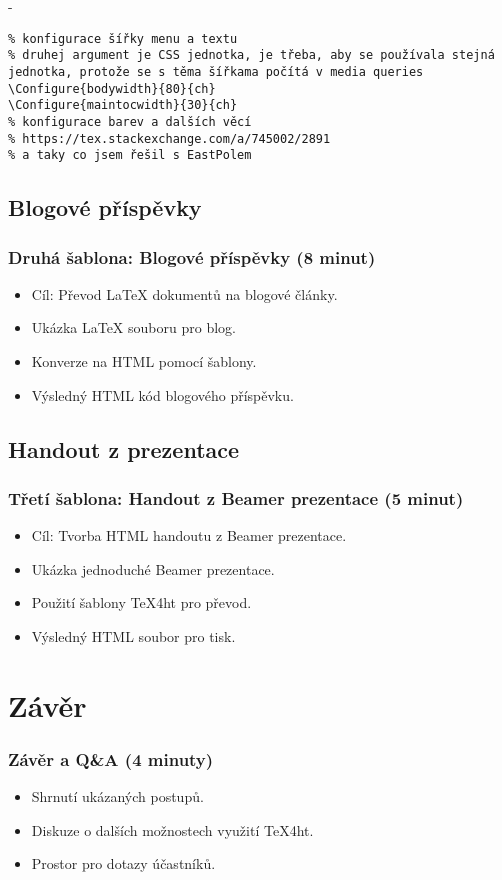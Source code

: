 \documentclass{beamer}
\begin{document}
- 

\begin{verbatim}
% konfigurace šířky menu a textu
% druhej argument je CSS jednotka, je třeba, aby se používala stejná jednotka, protože se s těma šířkama počítá v media queries
\Configure{bodywidth}{80}{ch}
\Configure{maintocwidth}{30}{ch}
% konfigurace barev a dalších věcí
% https://tex.stackexchange.com/a/745002/2891
% a taky co jsem řešil s EastPolem
\end{verbatim}


\subsection{Blogové příspěvky}
\begin{frame}
\frametitle{Druhá šablona: Blogové příspěvky (8 minut)}
\begin{itemize}
    \item Cíl: Převod LaTeX dokumentů na blogové články.
    \item Ukázka LaTeX souboru pro blog.
    \item Konverze na HTML pomocí šablony.
    \item Výsledný HTML kód blogového příspěvku.
\end{itemize}
\end{frame}

\subsection{Handout z prezentace}
\begin{frame}
\frametitle{Třetí šablona: Handout z Beamer prezentace (5 minut)}
\begin{itemize}
    \item Cíl: Tvorba HTML handoutu z Beamer prezentace.
    \item Ukázka jednoduché Beamer prezentace.
    \item Použití šablony TeX4ht pro převod.
    \item Výsledný HTML soubor pro tisk.
\end{itemize}
\end{frame}

\section{Závěr}

\begin{frame}
\frametitle{Závěr a Q\&A (4 minuty)}
\begin{itemize}
    \item Shrnutí ukázaných postupů.
    \item Diskuze o dalších možnostech využití TeX4ht.
    \item Prostor pro dotazy účastníků.
\end{itemize}
\end{frame}
\end{document}
